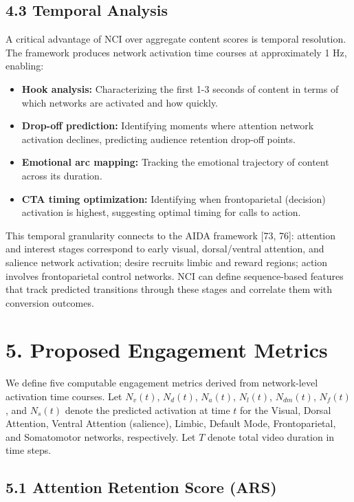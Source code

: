 \documentclass[11pt,letterpaper]{article}
\begin{document}
\subsection{4.3 Temporal Analysis}

A critical advantage of NCI over aggregate content scores is temporal resolution. The framework produces network activation time courses at approximately 1 Hz, enabling:
\begin{itemize}
  \item \textbf{Hook analysis:} Characterizing the first 1-3 seconds of content in terms of which networks are activated and how quickly.
  \item \textbf{Drop-off prediction:} Identifying moments where attention network activation declines, predicting audience retention drop-off points.
  \item \textbf{Emotional arc mapping:} Tracking the emotional trajectory of content across its duration.
  \item \textbf{CTA timing optimization:} Identifying when frontoparietal (decision) activation is highest, suggesting optimal timing for calls to action.
\end{itemize}
This temporal granularity connects to the AIDA framework [73, 76]: attention and interest stages correspond to early visual, dorsal/ventral attention, and salience network activation; desire recruits limbic and reward regions; action involves frontoparietal control networks. NCI can define sequence-based features that track predicted transitions through these stages and correlate them with conversion outcomes.


\section{5. Proposed Engagement Metrics}

We define five computable engagement metrics derived from network-level activation time courses. Let $N_v(t)$, $N_d(t)$, $N_a(t)$, $N_l(t)$, $N_{dm}(t)$, $N_f(t)$, and $N_s(t)$ denote the predicted activation at time $t$ for the Visual, Dorsal Attention, Ventral Attention (salience), Limbic, Default Mode, Frontoparietal, and Somatomotor networks, respectively. Let $T$ denote total video duration in time steps.

\subsection{5.1 Attention Retention Score (ARS)}
\end{document}
